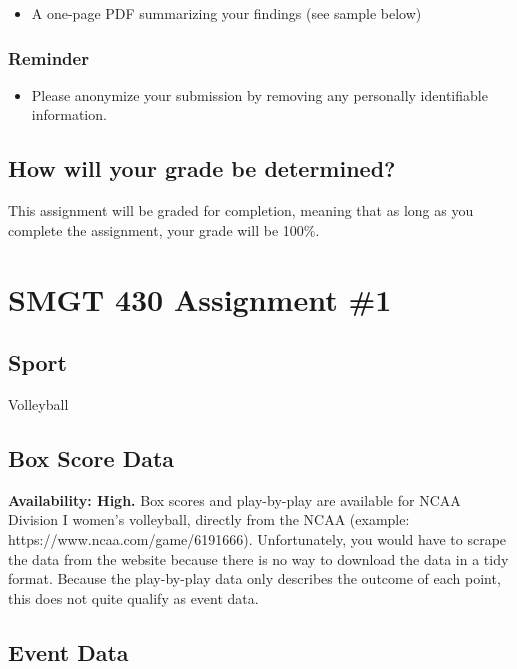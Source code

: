 \documentclass{article}
\begin{document}
        \begin{itemize}
          \item A one-page PDF summarizing your findings (see sample below)
        \end{itemize}

      \subsubsection*{\sc Reminder}

        \begin{itemize}
          \item Please anonymize your submission by removing any personally identifiable information.
        \end{itemize}

    \subsection*{\sc How will your grade be determined?}

      This assignment will be graded for completion, meaning that as long as you complete the assignment, your grade will be 100\%.
    
    \newpage

    \section*{SMGT 430 Assignment \#1}

      \subsection*{Sport}
      
        Volleyball
      
      \subsection*{Box Score Data}

        {\bf Availability: High.} Box scores and play-by-play are available for NCAA Division I women's volleyball, directly from the NCAA (example: https://www.ncaa.com/game/6191666). Unfortunately, you would have to scrape the data from the website because there is no way to download the data in a tidy format. Because the play-by-play data only describes the outcome of each point, this does not quite qualify as event data.

      \subsection*{Event Data}
\end{document}
